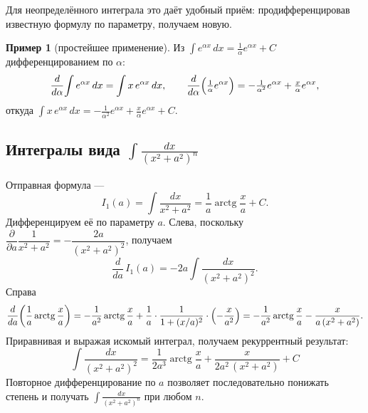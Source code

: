 \documentclass[11pt,a4paper]{article}
\theoremstyle{definition}
\newtheorem{example}[definition]{Пример}
\theoremstyle{plain}
\DeclareMathOperator{\arctg}{arctg}
\newcommand{\dx}{\,dx}
\begin{document}
\noindent Для неопределённого интеграла это даёт удобный приём: продифференцировав известную формулу
по параметру, получаем новую.

\begin{example}[простейшее применение]
Из $\displaystyle\int e^{\alpha x}\dx=\tfrac1\alpha e^{\alpha x}+C$ дифференцированием по $\alpha$:
\[
  \frac{d}{d\alpha}\!\int e^{\alpha x}\dx=\int x\,e^{\alpha x}\dx,
  \qquad
  \frac{d}{d\alpha}\Bigl(\tfrac1\alpha e^{\alpha x}\Bigr)=-\tfrac1{\alpha^2}e^{\alpha x}+\tfrac{x}{\alpha}e^{\alpha x},
\]
откуда $\displaystyle\int x\,e^{\alpha x}\dx=-\tfrac1{\alpha^2}e^{\alpha x}+\tfrac{x}{\alpha}e^{\alpha x}+C$.
\end{example}

\subsection{Интегралы вида $\displaystyle\int\frac{dx}{(x^2+a^2)^n}$}
Отправная формула —
\[
  I_1(a)=\int\frac{dx}{x^2+a^2}=\frac1a\arctg\frac xa+C .
\]
Дифференцируем её по параметру $a$. Слева, поскольку
$\dfrac{\partial}{\partial a}\dfrac{1}{x^2+a^2}=-\dfrac{2a}{(x^2+a^2)^2}$, получаем
\[
  \frac{d}{da}\,I_1(a)=-2a\int\frac{dx}{(x^2+a^2)^2}.
\]
Справа
\[
  \frac{d}{da}\!\left(\frac1a\arctg\frac xa\right)
   =-\frac1{a^2}\arctg\frac xa+\frac1a\cdot\frac{1}{1+(x/a)^2}\cdot\Bigl(-\frac{x}{a^2}\Bigr)
   =-\frac1{a^2}\arctg\frac xa-\frac{x}{a\,(x^2+a^2)} .
\]
Приравнивая и выражая искомый интеграл, получаем рекуррентный результат:
\[
  \boxed{\;\int\frac{dx}{(x^2+a^2)^2}
   =\frac{1}{2a^3}\arctg\frac xa+\frac{x}{2a^2\,(x^2+a^2)}+C\;}
\]
Повторное дифференцирование по $a$ позволяет последовательно понижать степень и получать
$\displaystyle\int\frac{dx}{(x^2+a^2)^n}$ при любом $n$.
\end{document}
